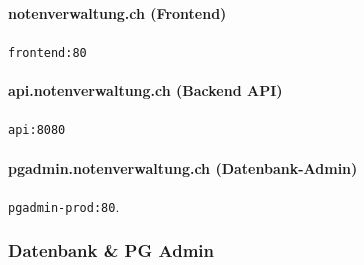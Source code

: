 \documentclass[11pt]{article}
\begin{document}
    \paragraph{notenverwaltung.ch (Frontend)} \texttt{frontend:80}

    

    \paragraph{api.notenverwaltung.ch (Backend API)}\texttt{api:8080}

    

    \paragraph{pgadmin.notenverwaltung.ch (Datenbank-Admin)} \texttt{pgadmin-prod:80}.

    

    \subsubsection{Datenbank \& PG Admin}
\end{document}
